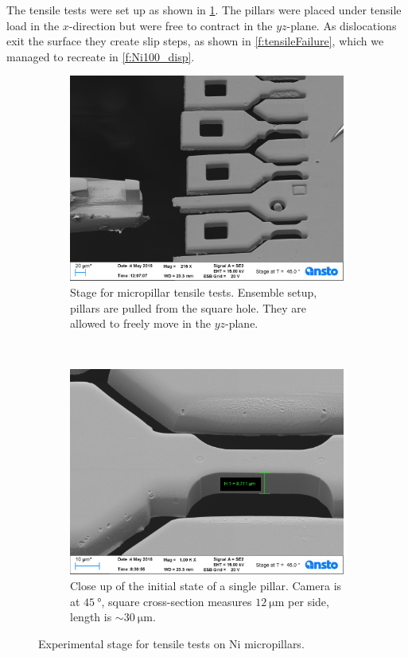 The tensile tests were set up as shown in \cref{f:expSetup}. The pillars were placed under tensile load in the $x$-direction but were free to contract in the $yz$-plane. As dislocations exit the surface they create slip steps, as shown in \cref{f:tensileFailure}, which we managed to recreate in \cref{f:Ni100_disp}.
\begin{figure}
    \centering
    \begin{subfigure}[t]{0.45\linewidth}
        \includegraphics[width=\linewidth]{../data/Ni024.jpg}
        \caption[Stage for micropillar tensile tests.]{Stage for micropillar tensile tests. Ensemble setup, pillars are pulled from the square hole. They are allowed to freely move in the $yz$-plane.}
    \end{subfigure}
    ~
    \begin{subfigure}[t]{0.45\linewidth}
        \centering
        \includegraphics[width=\linewidth]{../data/Ni000.jpg}
        \caption[Close up of the initial state of a single pillar.]{Close up of the initial state of a single pillar. Camera is at $\SI{45}{\degree}$, square cross-section measures $\SI{12}{\micro\metre}$ per side, length is $\sim \SI{30}{\micro\metre}$.}
    \end{subfigure}
    \caption{Experimental stage for tensile tests on Ni micropillars.}
    \label{f:expSetup}
\end{figure}
